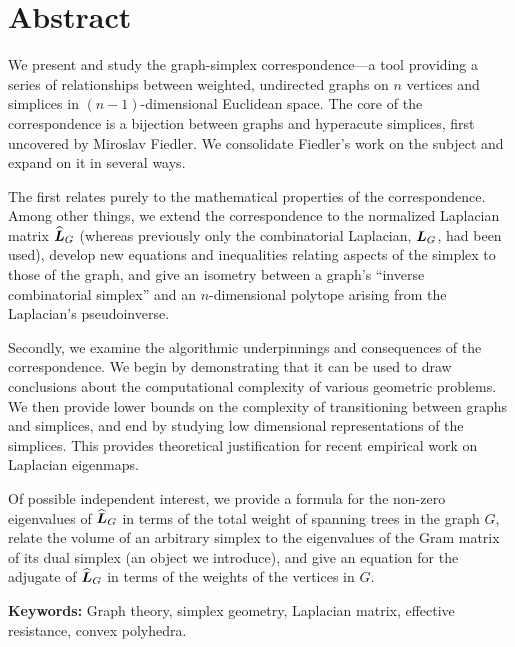 \chapter*{Abstract}



We present and study the graph-simplex correspondence---a tool providing a series of relationships between weighted, undirected graphs on $n$ vertices and simplices in $(n-1)$-dimensional Euclidean space. The core of the correspondence is a  bijection between graphs and hyperacute simplices, first uncovered by Miroslav Fiedler. We consolidate Fiedler's  work on  the subject and expand on it  in several  ways. 


The first relates purely to  the mathematical  properties  of the  correspondence. Among  other things, we extend the correspondence to the normalized Laplacian matrix $\widehat{\vb*{L}}_G$ (whereas previously only the combinatorial  Laplacian,  $\vb*{L}_G$, had been used), develop new equations and  inequalities relating aspects  of the simplex to those of the graph, and give an isometry between a graph's ``inverse combinatorial  simplex''  and an $n$-dimensional polytope arising from the Laplacian's pseudoinverse. 

Secondly, we examine the algorithmic underpinnings and consequences of the correspondence. We begin  by  demonstrating that it can be used to draw  conclusions about the computational complexity of various geometric problems. We then provide lower bounds on the complexity of transitioning between graphs and  simplices, and end by studying  
 low dimensional representations of the simplices.  This provides theoretical justification for recent empirical  work on Laplacian eigenmaps. 

Of possible independent interest, we provide a formula for  the non-zero eigenvalues of $\widehat{\vb*{L}}_G$  in terms of the total weight of spanning trees in the graph $G$, relate the volume of an arbitrary simplex to the eigenvalues of the Gram matrix of its dual simplex (an object we introduce), and give an equation for the adjugate of $\widehat{\vb*{L}}_G$ in terms of the weights of the vertices in  $G$.  
 


\vspace{1cm}
\noindent \textbf{Keywords:}  Graph theory,  simplex geometry, Laplacian matrix, effective resistance,  convex  polyhedra. 




